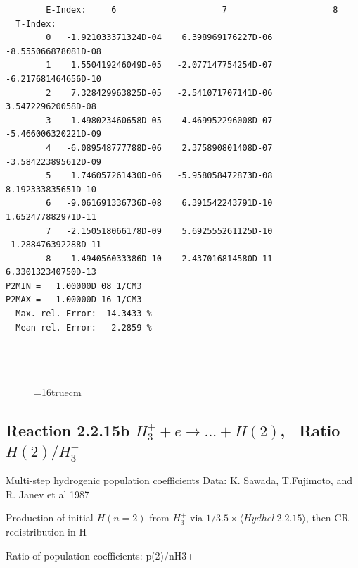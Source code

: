 \documentclass[12pt,dvipdfmx]{article}
\begin{document}
\begin{small}
\begin{verbatim}
        E-Index:     6                     7                     8
  T-Index:
        0   -1.921033371324D-04    6.398969176227D-06   -8.555066878081D-08
        1    1.550419246049D-05   -2.077147754254D-07   -6.217681464656D-10
        2    7.328429963825D-05   -2.541071707141D-06    3.547229620058D-08
        3   -1.498023460658D-05    4.469952296008D-07   -5.466006320221D-09
        4   -6.089548777788D-06    2.375890801408D-07   -3.584223895612D-09
        5    1.746057261430D-06   -5.958058472873D-08    8.192333835651D-10
        6   -9.061691336736D-08    6.391542243791D-10    1.652477882971D-11
        7   -2.150518066178D-09    5.692555261125D-10   -1.288476392288D-11
        8   -1.494056033386D-10   -2.437016814580D-11    6.330132340750D-13
P2MIN =   1.00000D 08 1/CM3
P2MAX =   1.00000D 16 1/CM3
  Max. rel. Error:  14.3433 %
  Mean rel. Error:   2.2859 %




\end{verbatim}\end{small}
\begin{figure} \label{2.2.15a}
\epsfxsize=16truecm
\end{figure}
\newpage


\subsection{
Reaction 2.2.15b $ H_3^+ + e \rightarrow ...+ H(2) $, \   Ratio $H(2)/H_3^+  $
}

 Multi-step hydrogenic population coefficients
 Data: K. Sawada, T.Fujimoto, \cite{kn:Sawada} and R. Janev et al 1987

 Production of initial $H(n=2)$ from $H_3^+$ via $1/3.5 \times \langle Hydhel~ 2.2.15\rangle$,
 then CR redistribution in H

 Ratio of population coefficients: p(2)/nH3+
\end{document}
